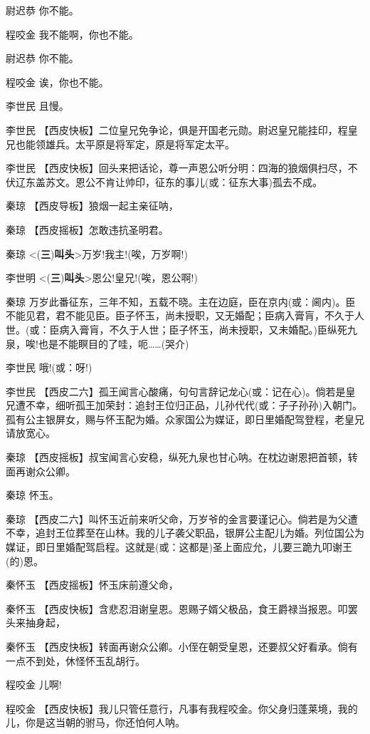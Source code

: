 尉迟恭 你不能。

程咬金 我不能啊，你也不能。

尉迟恭 你不能。

程咬金 诶，你也不能。

李世民 且慢。

李世民
【西皮快板】二位皇兄免争论，俱是开国老元勋。尉迟皇兄能挂印，程皇兄也能领雄兵。太平原是将军定，原是将军定太平。

李世民
【西皮快板】回头来把话论，尊一声恩公听分明：四海的狼烟俱扫尽，不伏辽东盖苏文。恩公不肯让帅印，征东的事儿(或：征东大事)孤去不成。

秦琼 【西皮导板】狼烟一起主亲征呐，

秦琼 【西皮摇板】怎敢违抗圣明君。

秦琼
\textless{}(\textbf{三})\textbf{叫头}\textgreater{}万岁!我主!(唉，万岁啊!)

李世明
\textless{}(\textbf{三})\textbf{叫头}\textgreater{}恩公!皇兄!(唉，恩公啊!)

秦琼
万岁此番征东，三年不知，五载不晓。主在边庭，臣在京内(或：阃内)。臣不能见君，君不能见臣。臣子怀玉，尚未授职，又无婚配；臣病入膏肓，不久于人世。(或：臣病入膏肓，不久于人世；臣子怀玉，尚未授职，又未婚配。)臣纵死九泉，唉!也是不能瞑目的了哇，呃\ldots{}\ldots{}(哭介)

李世民 哦!(或：呀!)

李世民
【西皮二六】孤王闻言心酸痛，句句言辞记龙心(或：记在心)。倘若是皇兄遭不幸，细听孤王加荣封：追封王位归正品，儿孙代代(或：子子孙孙)入朝门。孤有公主银屏女，赐与怀玉配为婚。众家国公为媒证，即日里婚配驾登程，老皇兄请放宽心。

秦琼
【西皮摇板】叔宝闻言心安稳，纵死九泉也甘心呐。在枕边谢恩把首顿，转面再谢众公卿。

秦琼 怀玉。

秦琼
【西皮二六】叫怀玉近前来听父命，万岁爷的金言要谨记心。倘若是为父遭不幸，追封王位葬至在山林。我的儿子袭父职品，银屏公主配儿为婚。列位国公为媒证，即日里婚配驾启程。这就是(或：这都是)圣上面应允，儿要三跪九叩谢王(的)恩。

秦怀玉 【西皮摇板】怀玉床前遵父命，

秦怀玉
【西皮快板】含悲忍泪谢皇恩。恩赐子婿父极品，食王爵禄当报恩。叩罢头来抽身起，

秦怀玉
【西皮快板】转面再谢众公卿。小侄在朝受皇恩，还要叔父好看承。倘有一点不到处，休怪怀玉乱胡行。

程咬金 儿啊!

程咬金
【西皮快板】我儿只管任意行，凡事有我程咬金。你父身归蓬莱境，我的儿，你是这当朝的驸马，你还怕何人呐。


